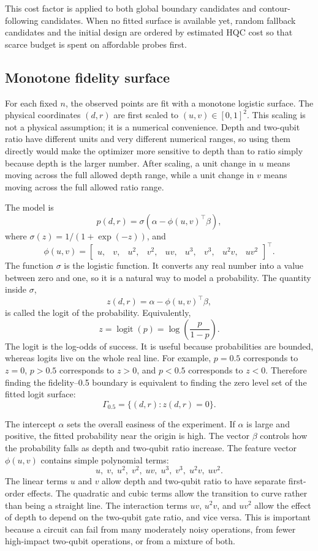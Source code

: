 This cost factor is applied to both global boundary candidates and
contour-following candidates.  When no fitted surface is available yet, random
fallback candidates and the initial design are ordered by estimated HQC cost so
that scarce budget is spent on affordable probes first.

\subsection{Monotone fidelity surface}

For each fixed \(n\), the observed points are fit with a monotone logistic
surface.  The physical coordinates \((d,r)\) are first scaled to
\((u,v) \in [0,1]^2\).  This scaling is not a physical assumption; it is a
numerical convenience.  Depth and two-qubit ratio have different units and very
different numerical ranges, so using them directly would make the optimizer
more sensitive to depth than to ratio simply because depth is the larger
number.  After scaling, a unit change in \(u\) means moving across the full
allowed depth range, while a unit change in \(v\) means moving across the full
allowed ratio range.

The model is
\[
    p(d,r)
    =
    \sigma\!\left(
        \alpha - \phi(u,v)^\top \beta
    \right),
\]
where \(\sigma(z) = 1/(1+\exp(-z))\), and
\[
    \phi(u,v)
    =
    \begin{bmatrix}
    u,& v,& u^2,& v^2,& uv,& u^3,& v^3,& u^2v,& uv^2
    \end{bmatrix}^{\top}.
\]
The function \(\sigma\) is the logistic function.  It converts any real number
into a value between zero and one, so it is a natural way to model a probability.
The quantity inside \(\sigma\),
\[
    z(d,r) = \alpha - \phi(u,v)^\top\beta,
\]
is called the logit of the probability.  Equivalently,
\[
    z = \operatorname{logit}(p)
    =
    \log\!\left(\frac{p}{1-p}\right).
\]
The logit is the log-odds of success.  It is useful because probabilities are
bounded, whereas logits live on the whole real line.  For example, \(p=0.5\)
corresponds to \(z=0\), \(p>0.5\) corresponds to \(z>0\), and \(p<0.5\)
corresponds to \(z<0\).  Therefore finding the fidelity--0.5 boundary is
equivalent to finding the zero level set of the fitted logit surface:
\[
    \Gamma_{0.5}
    =
    \{(d,r): z(d,r)=0\}.
\]

The intercept \(\alpha\) sets the overall easiness of the experiment.  If
\(\alpha\) is large and positive, the fitted probability near the origin is
high.  The vector \(\beta\) controls how the probability falls as depth and
two-qubit ratio increase.  The feature vector \(\phi(u,v)\) contains simple
polynomial terms:
\[
    u,\; v,\; u^2,\; v^2,\; uv,\; u^3,\; v^3,\; u^2v,\; uv^2.
\]
The linear terms \(u\) and \(v\) allow depth and two-qubit ratio to have separate
first-order effects.  The quadratic and cubic terms allow the transition to
curve rather than being a straight line.  The interaction terms \(uv\),
\(u^2v\), and \(uv^2\) allow the effect of depth to depend on the two-qubit gate
ratio, and vice versa.  This is important because a circuit can fail from many
moderately noisy operations, from fewer high-impact two-qubit operations, or
from a mixture of both.

